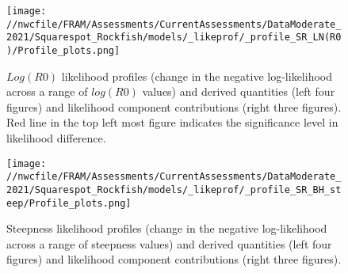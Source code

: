 \documentclass[11pt,
  english,
  a4paper,
]{article}
\begin{document}
\tagmcend\tagstructend


\begin{figure}
\centering
\texttt{[image: //nwcfile/FRAM/Assessments/CurrentAssessments/DataModerate\_2021/Squarespot\_Rockfish/models/\_likeprof/\_profile\_SR\_LN(R0)/Profile\_plots.png]}
\caption{{\(Log(R0)\)\leavevmode\tagmcend\tagstructend} likelihood profiles (change in the negative log-likelihood across a range of {\(log(R0)\)\leavevmode\tagmcend\tagstructend} values) and derived quantities (left four figures) and likelihood component contributions (right three figures). Red line in the top left most figure indicates the significance level in likelihood difference.\label{fig:r0-profile-combo}}
\end{figure}

\tagmcend\tagstructend


\begin{figure}
\centering
\texttt{[image: //nwcfile/FRAM/Assessments/CurrentAssessments/DataModerate\_2021/Squarespot\_Rockfish/models/\_likeprof/\_profile\_SR\_BH\_steep/Profile\_plots.png]}
\caption{Steepness likelihood profiles (change in the negative log-likelihood across a range of steepness values) and derived quantities (left four figures) and likelihood component contributions (right three figures).\label{fig:steepness-profile-combo}}
\end{figure}

\tagmcend\tagstructend

\end{document}
